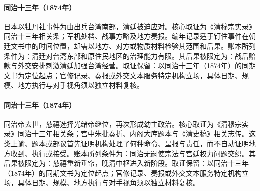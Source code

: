 \hypertarget{ledger:EQ-1874-JAPANESE-TAIWAN-EXPEDITION}{}\paragraph{同治十三年（1874年）}日本以牡丹社事件为由出兵台湾南部，清廷被迫应对。核心取证为《清穆宗实录》同治十三年相关条；军机处档、战事方略及地方奏报。编年记录适于钉住事件在朝廷文书中的时间位置，却需以地方、对方或物质材料检验其范围和后果。账本所列条件为：清廷对台湾东部和原住民地区的治理能力有限。其后果被限定为：战后赔款与外交安排刺激清廷加强台湾经营。取证保留：以同治十三年（1874年）的同期文书为定位起点；官修记录、奏报或外交文本服务特定机构立场，具体日期、规模、地方执行与对手视角须以独立材料复核。
\hypertarget{ledger:EQ-1874-TONGZHI-DEATH}{}\paragraph{同治十三年（1874年）}同治帝去世，慈禧选择光绪帝继位，再次形成幼主政治。核心取证为《清穆宗实录》同治十三年相关条；宫中朱批奏折、内阁大库题本与《清史稿》相关志传。这类上谕、题本或部议首先证明机构处理了何种命令、呈报与责任，而不自动证明地方收到、执行或接受。账本所列条件为：同治无嗣使宗法与宫廷权力问题交织。其后果被限定为：慈禧重新垂帘，晚清中枢进入新阶段。取证保留：以同治十三年（1874年）的同期文书为定位起点；官修记录、奏报或外交文本服务特定机构立场，具体日期、规模、地方执行与对手视角须以独立材料复核。

